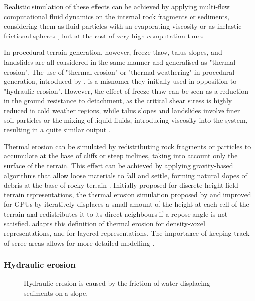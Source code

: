 \smallConclusion

Realistic simulation of these effects can be achieved by applying multi-flow computational fluid dynamics on the internal rock fragments or sediments, considering them as fluid particles with an evaporating viscosity \cite{Feng2024,Harmon2001,Lenaerts2009} or as inelastic frictional spheres \cite{Walton1993}, but at the cost of very high computation times.

In procedural terrain generation, however, freeze-thaw, talus slopes, and landslides are all considered in the same manner and generalised as "thermal erosion". The use of "thermal erosion" or "thermal weathering" in procedural generation, introduced by \cite{Musgrave1989}, is a misnomer they initially used in opposition to "hydraulic erosion". However, the effect of freeze-thaw can be seen as a reduction in the ground resistance to detachment, as the critical shear stress is highly reduced in cold weather regions, while talus slopes and landslides involve finer soil particles or the mixing of liquid fluids, introducing viscosity into the system, resulting in a quite similar output \cite{Hudak2011}.

Thermal erosion can be simulated by redistributing rock fragments or particles to accumulate at the base of cliffs or steep inclines, taking into account only the surface of the terrain. This effect can be achieved by applying gravity-based algorithms that allow loose materials to fall and settle, forming natural slopes of debris at the base of rocky terrain \cite{Musgrave1989,Jones2010}. Initially proposed for discrete height field terrain representations, the thermal erosion simulation proposed by \citep{Musgrave1989} and improved for GPUs by \cite{Jako2011} iteratively displaces a small amount of the height at each cell of the terrain and redistributes it to its direct neighbours if a repose angle is not satisfied. \citep{Jones2010} adapts this definition of thermal erosion for density-voxel representations, and \citep{Benes2001} for layered representations. The importance of keeping track of scree areas allows for more detailed modelling \cite{Peytavie2009a,Paris2020}.

\subsubsection{Hydraulic erosion}
\begin{figure}
    \caption{Hydraulic erosion is caused by the friction of water displacing sediments on a slope.}
    \label{fig:erosion-hydraulic-erosion}
\end{figure}

